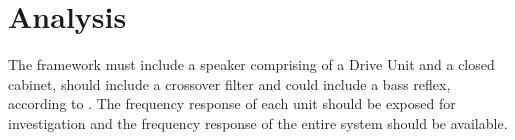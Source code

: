 \section{Analysis}
The framework must include a speaker comprising of a Drive Unit and a closed cabinet, should include a crossover filter and could include a bass reflex, according to .
The frequency response of each unit should be exposed 
for investigation and the frequency response of the entire system should be available.